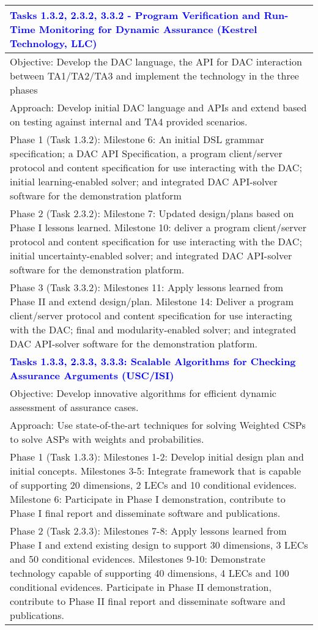 {\begin{longtable} {|p{\textwidth} | }
\textcolor{blue} {\footnotesize {\textbf{Tasks 1.3.2, 2.3.2, 3.3.2 - Program Verification and Run-Time Monitoring for Dynamic Assurance (Kestrel Technology, LLC)}}} \\ \hline
Objective: Develop the DAC language, the API for DAC interaction between TA1/TA2/TA3 and implement the technology in the three phases \\ \hline
Approach: Develop initial DAC language and APIs and extend based on testing against internal and TA4 provided scenarios. \\ \hline
Phase 1 (Task 1.3.2): Milestone 6: An initial DSL grammar specification; a DAC API Specification, a program client/server protocol and content specification for use interacting with the DAC; initial learning-enabled solver; and integrated DAC API-solver software for the demonstration platform \\ \hline
Phase 2 (Task 2.3.2): Milestone 7:  Updated design/plans based on Phase I lessons learned. Milestone 10: deliver a program client/server protocol and content specification for use interacting with the DAC; initial uncertainty-enabled solver; and integrated DAC API-solver software for the demonstration platform. \\ \hline
Phase 3 (Task 3.3.2): Milestones 11:  Apply lessons learned from Phase II and extend design/plan.  Milestone 14: Deliver a program client/server protocol and content specification for use interacting with the DAC; final and modularity-enabled solver; and integrated DAC API-solver software for the demonstration platform.  \\ \hline
\textcolor{blue} {\footnotesize {\textbf{Tasks 1.3.3, 2.3.3, 3.3.3: Scalable Algorithms for Checking Assurance Arguments (USC/ISI)}}} \\ \hline
Objective: Develop innovative algorithms for efficient dynamic assessment of assurance cases. \\ \hline
Approach: Use state-of-the-art techniques for solving Weighted CSPs to solve ASPs with weights and probabilities. \\ \hline
Phase 1 (Task 1.3.3): Milestones 1-2: Develop initial design plan and initial concepts. Milestones 3-5: Integrate framework that is capable of supporting 20 dimensions, 2 LECs and 10 conditional evidences. Milestone 6: Participate in Phase I demonstration, contribute to Phase I final report and disseminate software and publications. \\ \hline
Phase 2 (Task 2.3.3): Milestones 7-8: Apply lessons learned from Phase I and extend existing design to support 30 dimensions, 3 LECs and 50 conditional evidences. Milestones 9-10: Demonstrate technology capable of supporting 40 dimensions, 4 LECs and 100 conditional evidences. Participate in Phase II demonstration, contribute to Phase II final report and disseminate software and publications. \\ \hline

\end{longtable}}
